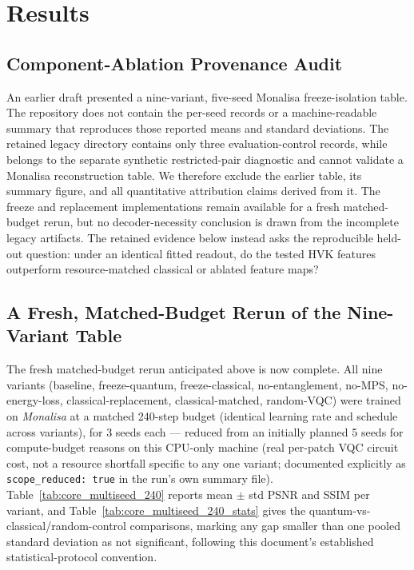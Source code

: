 \documentclass[11pt]{article}
\begin{document}
\section{Results}
\label{sec:supp_results}

\subsection{Component-Ablation Provenance Audit}
\label{sec:component_provenance}
\begin{sloppypar}
An earlier draft presented a nine-variant, five-seed Monalisa freeze-isolation table. The repository does not contain the per-seed records or a machine-readable summary that reproduces those reported means and standard deviations. The retained legacy directory contains only three evaluation-control records, while  belongs to the separate synthetic restricted-pair diagnostic and cannot validate a Monalisa reconstruction table. We therefore exclude the earlier table, its summary figure, and all quantitative attribution claims derived from it. The freeze and replacement implementations remain available for a fresh matched-budget rerun, but no decoder-necessity conclusion is drawn from the incomplete legacy artifacts. The retained evidence below instead asks the reproducible held-out question: under an identical fitted readout, do the tested HVK features outperform resource-matched classical or ablated feature maps?
\end{sloppypar}

\subsection{A Fresh, Matched-Budget Rerun of the Nine-Variant Table}
\label{sec:core_multiseed_rerun}
The fresh matched-budget rerun anticipated above is now complete. All nine variants (baseline, freeze-quantum, freeze-classical, no-entanglement, no-MPS, no-energy-loss, classical-replacement, classical-matched, random-VQC) were trained on \textit{Monalisa} at a matched 240-step budget (identical learning rate and schedule across variants), for 3 seeds each --- reduced from an initially planned 5 seeds for compute-budget reasons on this CPU-only machine (real per-patch VQC circuit cost, not a resource shortfall specific to any one variant; documented explicitly as \texttt{scope\_reduced: true} in the run's own summary file). Table~\ref{tab:core_multiseed_240} reports mean $\pm$ std PSNR and SSIM per variant, and Table~\ref{tab:core_multiseed_240_stats} gives the quantum-vs-classical/random-control comparisons, marking any gap smaller than one pooled standard deviation as not significant, following this document's established statistical-protocol convention.
\end{document}
